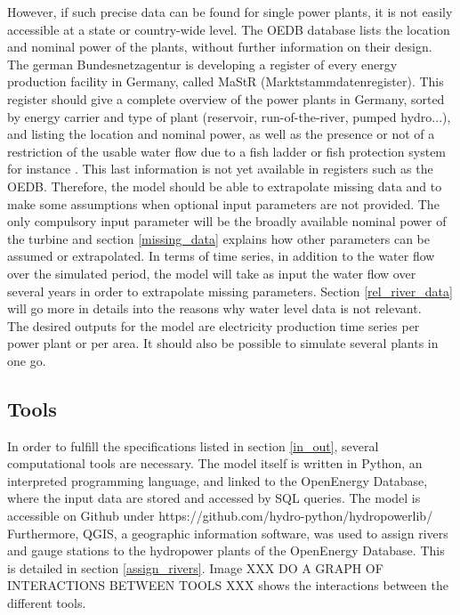 However, if such precise data can be found for single power plants, it is not easily accessible at a state or country-wide level. The OEDB database lists the location and nominal power of the plants, without further information on their design. The german Bundesnetzagentur is developing a register of every energy production facility in Germany, called MaStR (Marktstammdatenregister). This register should give a complete overview of the power plants in Germany, sorted by energy carrier and type of plant (reservoir, run-of-the-river, pumped hydro...), and listing the location and nominal power, as well as the presence or not of a restriction of the usable water flow due to a fish ladder or fish protection system for instance \cite{MaStR}. This last information is not yet available in registers such as the OEDB.
\newline
Therefore, the model should be able to extrapolate missing data and to make some assumptions when optional input parameters are not provided. The only compulsory input parameter will be the broadly available nominal power of the turbine and section \ref{missing_data} explains how other parameters can be assumed or extrapolated. \newline
In terms of time series, in addition to the water flow over the simulated period, the model will take as input the water flow over several years in order to extrapolate missing parameters. Section \ref{rel_river_data} will go more in details into the reasons why water level data is not relevant.\newline \\
The desired outputs for the model are electricity production time series per power plant or per area. It should also be possible to simulate several plants in one go.


\subsection{Tools}

In order to fulfill the specifications listed in section \ref{in_out}, several computational tools are necessary. The model itself is written in Python, an interpreted programming language, and linked to the OpenEnergy Database, where the input data are stored and accessed by SQL queries. The model is accessible on Github under https://github.com/hydro-python/hydropowerlib/
Furthermore, QGIS, a geographic information software, was used to assign rivers and gauge stations to the hydropower plants of the OpenEnergy Database. This is detailed in section \ref{assign_rivers}. Image XXX DO A GRAPH OF INTERACTIONS BETWEEN TOOLS XXX shows the interactions between the different tools.
